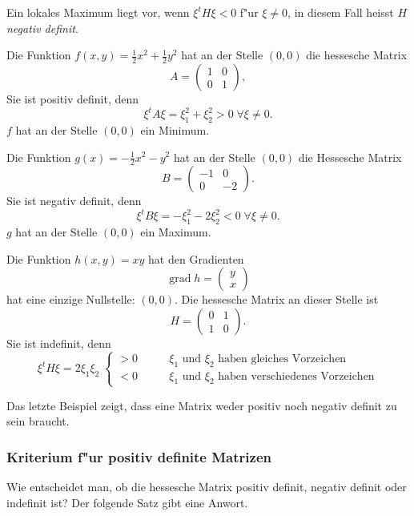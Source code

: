 Ein lokales Maximum liegt vor, wenn $\xi^tH\xi<0$ f"ur $\xi\ne 0$,
in diesem Fall heisst $H$ {\it negativ definit}.

\begin{beispiel}
Die Funktion $f(x,y)=\frac12x^2+\frac12y^2$ hat an der Stelle $(0,0)$
die hessesche Matrix
\[
A=\begin{pmatrix}
1&0\\0&1
\end{pmatrix},
\]
Sie ist positiv definit, denn
\[
\xi^t A\xi=\xi_1^2+\xi_2^2>0 \; \forall \xi\ne 0.
\]
$f$ hat an der Stelle $(0,0)$ ein Minimum.
\end{beispiel}

\begin{beispiel}
Die Funktion $g(x)=-\frac12x^2-y^2$ hat an der Stelle $(0,0)$
die Hessesche Matrix
\[
B=\begin{pmatrix}
-1&0\\0&-2
\end{pmatrix}.
\]
Sie ist negativ definit, denn
\[
\xi^tB\xi=-\xi_1^2-2\xi_2^2<0\;\forall \xi\ne 0.
\]
$g$ hat an der Stelle $(0,0)$ ein Maximum.
\end{beispiel}

\begin{beispiel}
Die Funktion $h(x,y)=xy$ hat den Gradienten
\[
\operatorname{grad}h=\begin{pmatrix}
y\\x
\end{pmatrix}
\]
hat eine einzige Nullstelle: $(0,0)$. Die hessesche Matrix an dieser
Stelle ist
\[
H=\begin{pmatrix}0&1\\1&0\end{pmatrix}.
\]
Sie ist indefinit, denn
\[
\xi^tH\xi=2\xi_1\xi_2\;
\begin{cases}
>0&\qquad \text{$\xi_1$ und $\xi_2$ haben gleiches Vorzeichen}\\
<0&\qquad \text{$\xi_1$ und $\xi_2$ haben verschiedenes Vorzeichen}
\end{cases}
\]
\end{beispiel}

Das letzte Beispiel zeigt, dass eine Matrix weder positiv noch negativ
definit zu sein braucht.

\subsubsection{Kriterium f"ur positiv definite Matrizen}
Wie entscheidet man, ob die hessesche Matrix positiv definit,
negativ definit oder indefinit ist? Der folgende Satz gibt eine 
Anwort.


